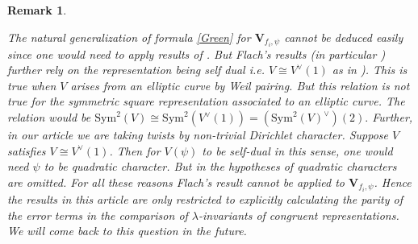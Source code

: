 \documentclass{amsart}
\newcommand{\bV}{\mathbf{V}}
\newtheorem{auxiliary proposition}[theorem]{Auxiliary Proposition}
\newtheorem{main conjecture}[theorem]{Main Conjecture}
\newtheorem{main theorem}[theorem]{Main Theorem}
\newtheorem{modesty proposition}[theorem]{Modesty Proposition}
\newtheorem{open problem}[theorem]{Open Problem}
\newtheorem{remark}[theorem]{Remark}
\newtheorem{convergence lemma}[theorem]{Convergence Lemma}
\newtheorem{corrected lemma}[theorem]{Corrected Lemma}
\newtheorem{growth lemma}[theorem]{Growth Lemma}
\newtheorem{coefficient lemma}[theorem]{Integrality Lemma}
\newtheorem{interpolation lemma}[theorem]{Interpolation Lemma}
\newtheorem{kernel lemma}[theorem]{Kernel Lemma}
\newtheorem{limit lemma}[theorem]{Limit Lemma}
\newtheorem{tandem lemma}[theorem]{Modesty Lemma}
\newtheorem{zero-finding lemma}[theorem]{Zero-Finding Lemma}
\begin{document}
\begin{remark}\label{rem:obs}

The natural generalization of formula \eqref{Green} for $\bV_{f_i,\psi}$ cannot be deduced easily since one would need to apply results of \cite{Flach}. But Flach's results  (in particular \cite[Theorem 2]{Flach}) further rely on the representation being self dual i.e. $V \cong V^\vee(1)$ as in \cite[paragraph after equation 18 in section ``Antisymmetry"]{Flach}).
This is true when $V$ arises from an elliptic curve by Weil pairing. But this relation is not true for the symmetric square representation associated to an elliptic curve. The relation would be 
$\mathrm{Sym}^2(V) \cong \mathrm{Sym}^2(V^\vee(1))=(\mathrm{Sym}^2(V)^\vee)(2).$
Further, in our article we are taking twists by non-trivial Dirichlet character. Suppose $V$ satisfies $V\cong V^\vee(1)$. Then for $V(\psi)$ to be self-dual in this sense, one would need $\psi$ to be quadratic character. But in the hypotheses of \cite[Theorem C]{LZ16} quadratic characters are omitted. For all these reasons  Flach's result  cannot be applied to $\bV_{f_i,\psi}$.
Hence the results in this article are only restricted to explicitly calculating the parity of the error terms in the comparison of $\lambda$-invariants of congruent representations. We will come back to this question in the future.

\end{remark}
\end{document}
